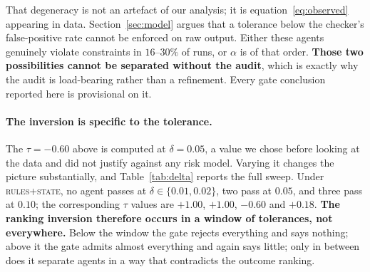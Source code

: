 \documentclass{article}
\begin{document}
That degeneracy is not an artefact of our analysis; it is equation~\eqref{eq:observed} appearing in data. Section~\ref{sec:model} argues that a tolerance below the checker's false-positive rate cannot be enforced on raw output. Either these agents genuinely violate constraints in $16$--$30\%$ of runs, or $\alpha$ is of that order. \textbf{Those two possibilities cannot be separated without the audit}, which is exactly why the audit is load-bearing rather than a refinement. Every gate conclusion reported here is provisional on it.

\paragraph{The inversion is specific to the tolerance.}
The $\tau=-0.60$ above is computed at $\delta=0.05$, a value we chose before looking at the data and did not justify against any risk model. Varying it changes the picture substantially, and Table~\ref{tab:delta} reports the full sweep. Under \textsc{rules+state}, no agent passes at $\delta\in\{0.01,0.02\}$, two pass at $0.05$, and three pass at $0.10$; the corresponding $\tau$ values are $+1.00$, $+1.00$, $-0.60$ and $+0.18$. \textbf{The ranking inversion therefore occurs in a window of tolerances, not everywhere.} Below the window the gate rejects everything and says nothing; above it the gate admits almost everything and again says little; only in between does it separate agents in a way that contradicts the outcome ranking.
\end{document}
